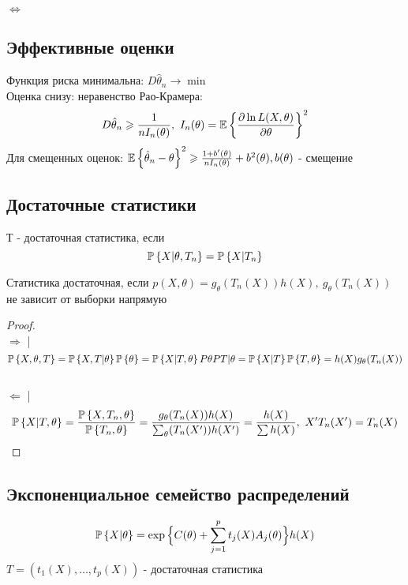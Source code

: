 $\Leftrightarrow$

\subsection*{Эффективные оценки} 
Функция риска минимальна: $ D\hat{\theta}_n \to \min$ \\
Оценка снизу: неравенство Рао-Крамера: $$ D\valuation \geq \frac{1}{nI_n(\theta)}, \ I_n(\theta) = \ex{\frac{\partial \ln L(X, \theta)}{\partial \theta}}^2$$
Для смещенных оценок: $\mathbb{E}\left\{ \hat{\theta}_n - \theta \right\}^2 \geqslant \frac{1+b'(\theta)}{nI_n(\theta)} + b^2(\theta), b(\theta)$ - смещение

\subsection*{Достаточные статистики}
\begin{definition} Т - достаточная статистика, если $$ \mathbb{P}\left\{ X|\theta, T_n \right\} = \mathbb{P}\left\{ X|T_n \right\} $$
\end{definition}

\begin{theorem}
Статистика достаточная, если $p(X, \theta) = g_{\theta}(T_n(X))h(X),\  g_{\theta}(T_n(X))$ не зависит от выборки напрямую \\
	\begin{proof} \\
	$\Rightarrow$ | \\
	$$ \mathbb{P}\left\{ X, \theta, T \right\} = \mathbb{P}\left\{ X, T|\theta \right\}\mathbb{P}\left\{ \theta \right\} = \mathbb{P}\left\{ X|T, \theta \right\}P{\theta}P{T|\theta} = \mathbb{P}\left\{ X|T \right\} \mathbb{P}\left\{ T, \theta \right\} = h(X)g_{\theta}(T_n(X)) $$ \\
	$\Leftarrow$ | \\
	$$ \mathbb{P}\left\{ X|T, \theta \right\} = \frac{\mathbb{P}\left\{ X, T_n, \theta \right\}}{\mathbb{P}\left\{ T_n, \theta \right\}} = \frac{g_{\theta}(T_n(X))h(X)}{\sum_{\theta}(T_n(X'))h(X')} = \frac{h(X)}{\sum h(X)}, \ X'T_n(X') = T_n(X) $$
	\end{proof}
\end{theorem}

\subsection*{Экспоненциальное семейство распределений}

\begin{definition}
$$\mathbb{P}\left\{ X|\theta \right\} = \exp \Big\{ C(\theta) + \sum_{j=1}^p t_j(X)A_j(\theta)\Big\}h(X)$$
$ T = (t_1(X), \ldots, t_p(X)) $ - достаточная статистика
\end{definition}

